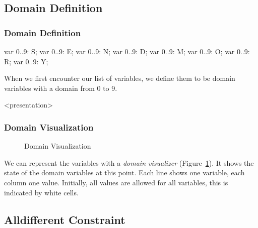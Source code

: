 \subsection{Domain Definition}


\begin{frame}[fragile]
  \frametitle{Domain Definition}
  \begin{semiverbatim}
var 0..9: S;
var 0..9: E;
var 0..9: N;
var 0..9: D;
var 0..9: M;
var 0..9: O;
var 0..9: R;
var 0..9: Y;

  \end{semiverbatim}
\end{frame}

When we first encounter our list of variables, we define them to be domain variables with a domain from 0 to 9.

\begin{frame}<presentation>
\frametitle{Domain Visualization}
\end{frame}

\begin{figure}[ht]
\caption{\label{sendmore:domainvisualizer}Domain Visualization}
\begin{center}

\end{center}
\end{figure}


We can represent the variables with a {\em domain visualizer} (Figure~\ref{sendmore:domainvisualizer}).
It shows the state of the domain variables at this point. Each line shows one variable, each column one value. Initially, all values are allowed for all variables, this is indicated by white cells.
 

\subsection{Alldifferent Constraint}

